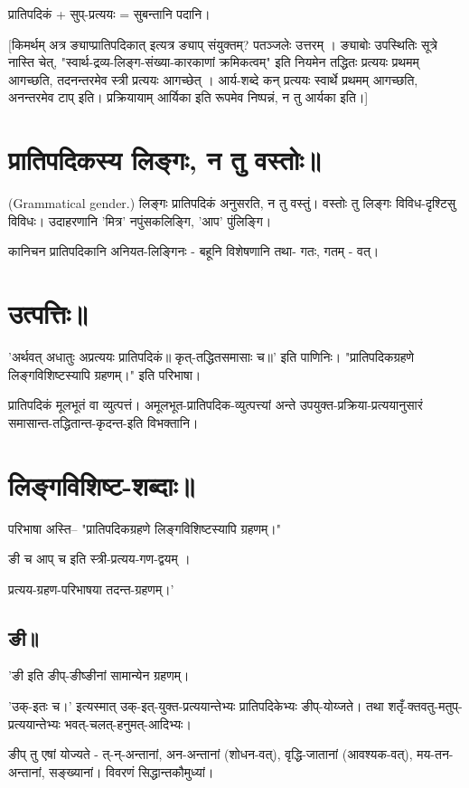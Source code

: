 \documentclass[oneside, article]{memoir}
\begin{document}
प्रातिपदिकं + सुप्-प्रत्ययः = सुबन्तानि पदानि।

[किमर्थम् अत्र ङ्याप्प्रातिपदिकात् इत्यत्र ङ्याप् संयुक्तम्? पतञ्जलेः उत्तरम् । ङ्याबोः उपस्थितिः सूत्रे नास्ति चेत्, "स्वार्थ-द्रव्य-लिङ्ग-संख्या-कारकाणां क्रमिकत्वम्" इति नियमेन तद्धितः प्रत्ययः प्रथमम् आगच्छति, तदनन्तरमेव स्त्री प्रत्ययः आगच्छेत् । आर्य-शब्दे कन् प्रत्ययः स्वार्थे प्रथमम् आगच्छति, अनन्तरमेव टाप् इति। प्रक्रियायाम् आर्यिका इति रूपमेव निष्पन्नं, न तु आर्यका इति।]

\section{प्रातिपदिकस्य लिङ्गः, न तु वस्तोः॥}
(Grammatical gender.) लिङ्गः प्रातिपदिकं अनुसरति, न तु वस्तुं। वस्तोः तु लिङ्गः विविध-दृश्टिसु विविधः। उदाहरणानि 'मित्र' नपुंसकलिङ्गि, 'आप' पुंलिङ्गि।

कानिचन प्रातिपदिकानि अनियत-लिङ्गिनः - बहूनि विशेषणानि तथा- गतः, गतम् - वत्।

\section{उत्पत्तिः॥}
'अर्थवत् अधातुः अप्रत्ययः प्रातिपदिकं॥ कृत्-तद्धितसमासाः च॥' इति पाणिनिः। "प्रातिपदिकग्रहणे लिङ्गविशिष्टस्यापि ग्रहणम्।" इति परिभाषा।

प्रातिपदिकं मूलभूतं वा व्युत्पत्तं। अमूलभूत-प्रातिपदिक-व्युत्पत्त्यां अन्ते उपयुक्त-प्रक्रिया-प्रत्ययानुसारं समासान्त-तद्धितान्त-कृदन्त-इति विभक्तानि।

\section{लिङ्गविशिष्ट-शब्दाः॥}
परिभाषा अस्ति-- "प्रातिपदिकग्रहणे लिङ्गविशिष्टस्यापि ग्रहणम्।"

ङी च आप् च इति स्त्री-प्रत्यय-गण-द्वयम् ।

प्रत्यय-ग्रहण-परिभाषया तदन्त-ग्रहणम्।'

\subsection{ङी॥}
'ङी इति ङीप्-ङीष्ङीनां सामान्येन ग्रहणम्। 

'उक्-इतः च।' इत्यस्मात् उक्-इत्-युक्त-प्रत्ययान्तेभ्यः प्रातिपदिकेभ्यः ङीप्-योय्जते। तथा शतृँ-क्तवतु-मतुप्-प्रत्ययान्तेभ्यः भवत्-चलत्-हनुमत्-आदिभ्यः।

ङीप् तु एषां योज्यते - त्-न्-अन्तानां, अन-अन्तानां (शोधन-वत्), वृद्धि-जातानां (आवश्यक-वत्), मय-तन-अन्तानां, सङ्ख्यानां। विवरणं सिद्धान्तकौमुध्यां।
\end{document}
